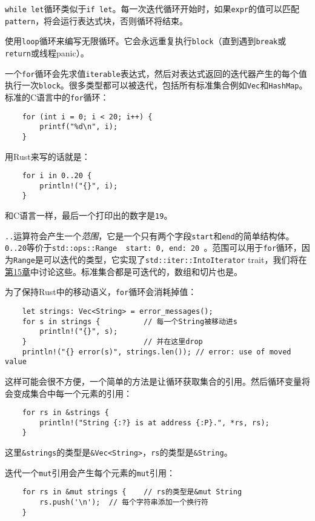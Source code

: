 \texttt{while let}循环类似于\texttt{if let}。每一次迭代循环开始时，如果\texttt{expr}的值可以匹配\texttt{pattern}，将会运行表达式块，否则循环将结束。

使用\texttt{loop}循环来编写无限循环。它会永远重复执行\texttt{block}（直到遇到\texttt{break}或\texttt{return}或线程panic）。

一个\texttt{for}循环会先求值\texttt{iterable}表达式，然后对表达式返回的迭代器产生的每个值执行一次\texttt{block}。很多类型都可以被迭代，包括所有标准集合例如\texttt{Vec}和\texttt{HashMap}。标准的C语言中的\texttt{for}循环：
\begin{verbatim}
    for (int i = 0; i < 20; i++) {
        printf("%d\n", i);
    }
\end{verbatim}
用Rust来写的话就是：
\begin{verbatim}
    for i in 0..20 {
        println!("{}", i);
    }
\end{verbatim}
和C语言一样，最后一个打印出的数字是\texttt{19}。

\texttt{..}运算符会产生一个\emph{范围}，它是一个只有两个字段\texttt{start}和\texttt{end}的简单结构体。\texttt{0..20}等价于\texttt{std::ops::Range { start: 0, end: 20 }}。范围可以用于\texttt{for}循环，因为\texttt{Range}是可以迭代的类型，它实现了\texttt{std::iter::IntoIterator} trait，我们将在\hyperref[ch15]{第15章}中讨论这些。标准集合都是可迭代的，数组和切片也是。

为了保持Rust中的移动语义，\texttt{for}循环会消耗掉值：
\begin{verbatim}
    let strings: Vec<String> = error_messages();
    for s in strings {          // 每一个String被移动进s
        println!("{}", s);
    }                           // 并在这里drop
    println!("{} error(s)", strings.len()); // error: use of moved value
\end{verbatim}

这样可能会很不方便，一个简单的方法是让循环获取集合的引用。然后循环变量将会变成集合中每一个元素的引用：
\begin{verbatim}
    for rs in &strings {
        println!("String {:?} is at address {:P}.", *rs, rs);
    }
\end{verbatim}

这里\texttt{\&strings}的类型是\texttt{\&Vec<String>}，\texttt{rs}的类型是\texttt{\&String}。

迭代一个\texttt{mut}引用会产生每个元素的\texttt{mut}引用：
\begin{verbatim}
    for rs in &mut strings {    // rs的类型是&mut String
        rs.push('\n');  // 每个字符串添加一个换行符
    }
\end{verbatim}

